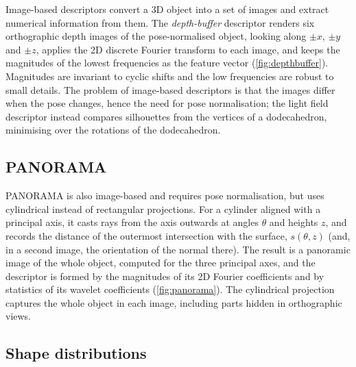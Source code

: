 Image-based descriptors convert a 3D object into a set of images and extract numerical information
from them. The \emph{depth-buffer} descriptor \citep{Vranic2004} renders six orthographic depth
images of the pose-normalised object, looking along $\pm x$, $\pm y$ and $\pm z$, applies the 2D
discrete Fourier transform to each image, and keeps the magnitudes of the lowest frequencies as the
feature vector (\cref{fig:depthbuffer}). Magnitudes are invariant to cyclic shifts and the low
frequencies are robust to small details. The problem of image-based descriptors is that the images
differ when the pose changes, hence the need for pose normalisation; the light field descriptor
\citep{Chen2003} instead compares silhouettes from the vertices of a dodecahedron, minimising over
the rotations of the dodecahedron.


\subsection{PANORAMA}

PANORAMA \citep{Papadakis2010} is also image-based and requires pose normalisation, but uses
cylindrical instead of rectangular projections. For a cylinder aligned with a principal axis, it
casts rays from the axis outwards at angles $\theta$ and heights $z$, and records the distance of the
outermost intersection with the surface, $s(\theta,z)$ (and, in a second image, the orientation of
the normal there). The result is a panoramic image of the whole object, computed for the three
principal axes, and the descriptor is formed by the magnitudes of its 2D Fourier coefficients and by
statistics of its wavelet coefficients (\cref{fig:panorama}). The cylindrical projection captures the
whole object in each image, including parts hidden in orthographic views.


\subsection{Shape distributions}

